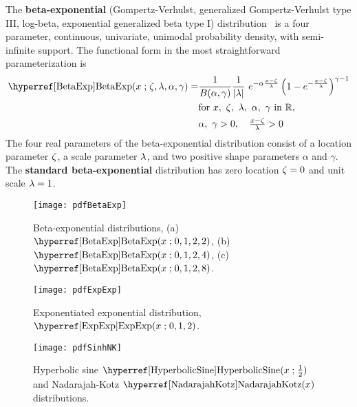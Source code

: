

\label{sec:BetaExp}

{}
{}
The {\bf beta-exponential} (Gompertz-Verhulst, generalized Gompertz-Verhulst type III, 
log-beta, exponential generalized beta type I) distribution~\cite{Ahuja1967,Nadarajah2006, Iyer-Biswas2014a} is a four parameter, continuous, univariate, unimodal probability density, with  semi-infinite  support. The functional form in the most straightforward parameterization is
\begin{align}
\label{BetaExp}
\opr{BetaExp}(x\given \pLoc,\pScale,\alpha, \gamma) =&
 \frac{1}{B(\alpha, \gamma)} \frac{1}{|\pScale|}\
 e^{-\alpha \frac{x-\pLoc}{\pScale} }  \left(1 - e^{-\frac{x-\pLoc}{\pScale}  }\right)^{\gamma-1} 
 \checked
 \\ \notag
 & \text{for } x,\ \pLoc,\ \pScale,\ \alpha,\  \gamma \text{ in } \mathbb{R}, \checked
 \\ \notag & \alpha,\ \gamma >0,\quad  \tfrac{x-\pLoc}{\pScale} >0 \checked
\end{align}
The four real parameters of the beta-exponential  distribution consist of a location parameter $\zeta$, a scale parameter $\lambda$, and two positive shape parameters $\alpha$ and $\gamma$. The {\bf standard beta-exponential} distribution has zero location $\zeta=0$ and unit scale $\lambda=1$.


\begin{figure}[p]
\begin{center}
\texttt{[image: pdfBetaExp]}
\end{center}
\caption[Beta-exponential distributions]{Beta-exponential distributions, (a) $\opr{BetaExp}(x\given 0,1,2, 2)$,
(b) $\opr{BetaExp}(x\given 0,1,2, 4)$,
(c) $\opr{BetaExp}(x\given 0,1,2, 8)$.
}
\end{figure}

\begin{figure}[p]
\begin{center}
\texttt{[image: pdfExpExp]}
\end{center}
\caption[Exponentiated exponential distribution]{Exponentiated exponential  distribution,  $\opr{ExpExp}(x\given 0,1,2)$.
}
\end{figure}


\begin{figure}[ht]
\begin{center}
\texttt{[image: pdfSinhNK]}
\end{center}
\caption[Hyperbolic sine and Nadarajah-Kotz distributions.]{Hyperbolic sine  $\opr{HyperbolicSine}(x\given \tfrac{1}{2})$ and Nadarajah-Kotz $\opr{NadarajahKotz}(x)$ distributions. }
\end{figure}



